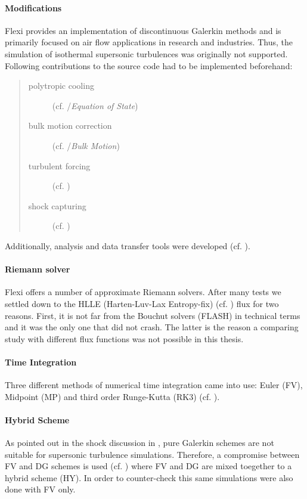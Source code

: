\paragraph{Modifications}
Flexi provides an implementation of discontinuous Galerkin methods and is
primarily focused on air flow applications in research and industries. Thus,
the simulation of isothermal supersonic turbulences was originally not
supported.  Following contributions to the source code had to be implemented
beforehand:
\begin{quote}
\begin{description}
    \item [polytropic cooling] (cf. /\emph{Equation of State})
    \item [bulk motion correction] (cf. /\emph{Bulk Motion})
    \item [turbulent forcing] (cf. )
    \item [shock capturing] (cf. )
\end{description}
\end{quote}
Additionally, analysis and data transfer tools were developed (cf. ).

\paragraph{Riemann solver}
Flexi offers a number of approximate Riemann solvers. After many tests we
settled down to the HLLE (Harten-Luv-Lax Entropy-fix) (cf. \cite{balsara_2010})
flux for two reasons.  First, it is not far from the Bouchut solvers (FLASH) in
technical terms and it was the only one that did not crash. The latter is the
reason a comparing study with different flux functions was not possible in this
thesis.

\paragraph{Time Integration}
Three different methods of numerical time integration came into use: Euler (FV),
Midpoint (MP) and third order Runge-Kutta (RK3) (cf. ).

\paragraph{Hybrid Scheme}
As pointed out in the shock discussion in , pure Galerkin schemes
are not suitable for supersonic turbulence simulations. Therefore, a compromise
between FV and DG schemes is used (cf. ) where FV and DG
are mixed toegether to a hybrid scheme (HY). In order to counter-check this
same simulations were also done with FV only.
